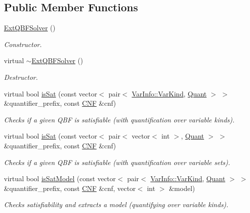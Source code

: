 \subsection*{Public Member Functions}
\begin{DoxyCompactItemize}
\item 
\hyperlink{classExtQBFSolver_aab51d0c8b2f2e1459247fe6183a31918}{Ext\-Q\-B\-F\-Solver} ()
\begin{DoxyCompactList}\small\item\em Constructor. \end{DoxyCompactList}\item 
virtual \hyperlink{classExtQBFSolver_a02cbc680022daebfb4c08ad40c06999e}{$\sim$\-Ext\-Q\-B\-F\-Solver} ()
\begin{DoxyCompactList}\small\item\em Destructor. \end{DoxyCompactList}\item 
virtual bool \hyperlink{classExtQBFSolver_abec25b97170b79b42b85d1d4ec825a39}{is\-Sat} (const vector$<$ pair$<$ \hyperlink{classVarInfo_a64d1da76cf84fe674e5fef9764ef11cf}{Var\-Info\-::\-Var\-Kind}, \hyperlink{classQBFSolver_ac091e263cb55286cc07b2451bcf4d3c7}{Quant} $>$ $>$ \&quantifier\-\_\-prefix, const \hyperlink{classCNF}{C\-N\-F} \&cnf)
\begin{DoxyCompactList}\small\item\em Checks if a given Q\-B\-F is satisfiable (with quantification over variable kinds). \end{DoxyCompactList}\item 
virtual bool \hyperlink{classExtQBFSolver_adc1bacec3307200dd90b260789e4c808}{is\-Sat} (const vector$<$ pair$<$ vector$<$ int $>$, \hyperlink{classQBFSolver_ac091e263cb55286cc07b2451bcf4d3c7}{Quant} $>$ $>$ \&quantifier\-\_\-prefix, const \hyperlink{classCNF}{C\-N\-F} \&cnf)
\begin{DoxyCompactList}\small\item\em Checks if a given Q\-B\-F is satisfiable (with quantification over variable sets). \end{DoxyCompactList}\item 
virtual bool \hyperlink{classExtQBFSolver_ad66c53343ce9c03eea6e4b5e7753f1b3}{is\-Sat\-Model} (const vector$<$ pair$<$ \hyperlink{classVarInfo_a64d1da76cf84fe674e5fef9764ef11cf}{Var\-Info\-::\-Var\-Kind}, \hyperlink{classQBFSolver_ac091e263cb55286cc07b2451bcf4d3c7}{Quant} $>$ $>$ \&quantifier\-\_\-prefix, const \hyperlink{classCNF}{C\-N\-F} \&cnf, vector$<$ int $>$ \&model)
\begin{DoxyCompactList}\small\item\em Checks satisfiability and extracts a model (quantifying over variable kinds). \end{DoxyCompactList}\item 

\end{DoxyCompactItemize}
